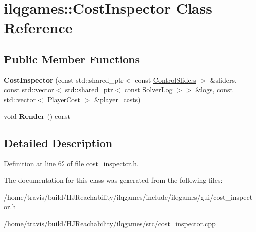 \hypertarget{classilqgames_1_1_cost_inspector}{}\section{ilqgames\+:\+:Cost\+Inspector Class Reference}
\label{classilqgames_1_1_cost_inspector}
\subsection*{Public Member Functions}
\begin{DoxyCompactItemize}
\item 
{\bfseries Cost\+Inspector} (const std\+::shared\+\_\+ptr$<$ const \hyperlink{classilqgames_1_1_control_sliders}{Control\+Sliders} $>$ \&sliders, const std\+::vector$<$ std\+::shared\+\_\+ptr$<$ const \hyperlink{classilqgames_1_1_solver_log}{Solver\+Log} $>$$>$ \&logs, const std\+::vector$<$ \hyperlink{classilqgames_1_1_player_cost}{Player\+Cost} $>$ \&player\+\_\+costs)\hypertarget{classilqgames_1_1_cost_inspector_a61f056c51232fa0d1321cb67bf04d7ab}{}\label{classilqgames_1_1_cost_inspector_a61f056c51232fa0d1321cb67bf04d7ab}

\item 
void {\bfseries Render} () const \hypertarget{classilqgames_1_1_cost_inspector_af6ccfb7db9e5672ee1798019b6aac177}{}\label{classilqgames_1_1_cost_inspector_af6ccfb7db9e5672ee1798019b6aac177}

\end{DoxyCompactItemize}


\subsection{Detailed Description}


Definition at line 62 of file cost\+\_\+inspector.\+h.



The documentation for this class was generated from the following files\+:\begin{DoxyCompactItemize}
\item 
/home/travis/build/\+H\+J\+Reachability/ilqgames/include/ilqgames/gui/cost\+\_\+inspector.\+h\item 
/home/travis/build/\+H\+J\+Reachability/ilqgames/src/cost\+\_\+inspector.\+cpp\end{DoxyCompactItemize}
